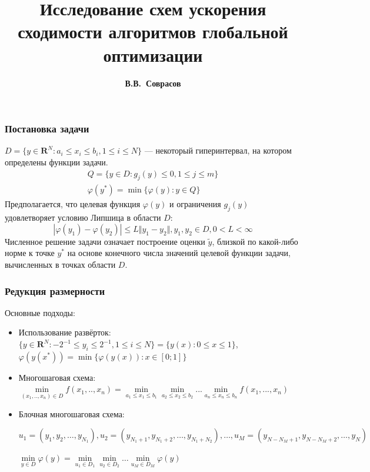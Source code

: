 \documentclass[aspectratio=1610]{beamer}
\title{Исследование схем ускорения сходимости алгоритмов глобальной оптимизации}
\author{\textbf{В.В.~Соврасов}}
\institute{ННГУ им. Н.И. Лобачевского}
\date{}
\begin{document}
\begin{frame}
\titlepage
\end{frame}

\begin{frame}
  \frametitle{Постановка задачи}
    \(D=\{y\in \mathbf{R}^N:a_i\leqslant x_i\leqslant{b_i}, 1\leqslant{i}\leqslant{N}\}\) ---
    некоторый гиперинтервал, на котором определены функции задачи.
  \begin{displaymath}
    \begin{array}{c}
      Q=\{y\in D: g_j(y)\leqslant 0,  1\leqslant{j}\leqslant{m}\}  \\
      \varphi(y^*)=\min\{\varphi(y):y\in Q\}
    \end{array}
  \end{displaymath}
  Предполагается, что целевая функция \(\varphi(y)\) и ограничения \(g_j(y)\) удовлетворяет условию Липшица в области \(D\):
  \begin{displaymath}
  |\varphi(y_1)-\varphi(y_2)|\leqslant L\Vert y_1-y_2\Vert,y_1,y_2\in D,0<L<\infty
  \end{displaymath}
  Численное решение задачи означает построение оценки \(\widetilde{y}\), близкой по какой-либо
  норме к точке \(y^*\) на основе конечного числа значений целевой функции задачи,
  вычисленных в точках области \(D\).
\end{frame}

\begin{frame}
  \frametitle{Редукция размерности}
  Основные подходы:
  \begin{itemize}
    \item<1-> Использование развёрток:
    \(\lbrace y\in \mathbf{R}^N:-2^{-1}\leqslant y_i\leqslant 2^{-1},1\leqslant i\leqslant N\rbrace=\{y(x):0\leqslant x\leqslant 1\}\),
    \(\varphi(y(x^*))=\min\{\varphi(y(x)):x\in [0;1]\}\)
    \item<2-> Многошаговая схема:
    \(\min\limits_{(x_1,..,x_n)\in D} f(x_1,..,x_n)=\min\limits_{a_1\leqslant x_1\leqslant b_1}\min\limits_{a_2\leqslant x_2\leqslant b_2}...\min\limits_{a_n\leqslant x_n\leqslant b_n} f(x_1,...,x_n)\)
    \item<3-> Блочная многошаговая схема:

    \(u_1=(y_1,y_2,\dots,y_{N_1}),u_2=(y_{N_1+1},y_{N_1+2},\dots,y_{N_1+N_2}),\dots,u_M=(y_{N-N_M+1},y_{N-N_M+2},\dots,y_N)\)

    \(\min\limits_{y\in D}\varphi(y)=\min\limits_{u_1\in D_1}\min\limits_{u_2\in D_2}\dots\min\limits_{u_M\in D_M}\varphi(y)\)
  \end{itemize}

\end{frame}
\end{document}
